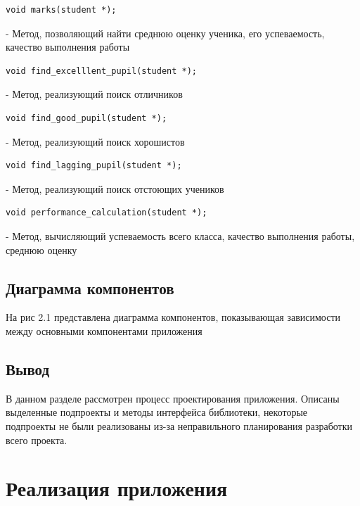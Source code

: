 \documentclass[12pt,a4paper]{report}
\begin{document}
\begin{verbatim}void marks(student *);\end{verbatim} - Метод, позволяющий найти среднюю оценку ученика, его успеваемость, качество выполнения работы
\begin{verbatim}void find_excelllent_pupil(student *);\end{verbatim}  - Метод, реализующий поиск отличников
\begin{verbatim}void find_good_pupil(student *);\end{verbatim} - Метод, реализующий поиск хорошистов
\begin{verbatim}void find_lagging_pupil(student *);\end{verbatim} - Метод, реализующий поиск отстоющих учеников
\begin{verbatim}void performance_calculation(student *);\end{verbatim} - Метод, вычисляющий успеваемость всего класса, качество выполнения работы, среднюю оценку
\section{Диаграмма компонентов}
\begin{figure}[h]
\caption{}
\label{fig:image}
\end{figure}
На рис 2.1 представлена диаграмма компонентов, показывающая зависимости между основными компонентами приложения


\section{Вывод}
В данном разделе рассмотрен процесс проектирования приложения. Описаны выделенные подпроекты и методы интерфейса библиотеки, некоторые подпроекты не были реализованы из-за неправильного планирования разработки всего проекта. 
\chapter{Реализация приложения}
\end{document}
